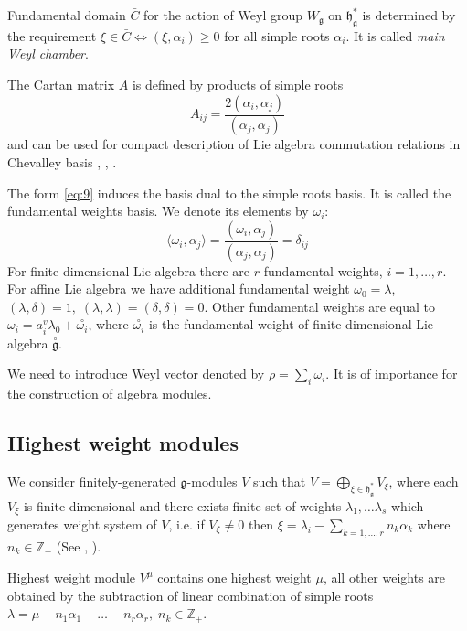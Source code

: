 \documentclass[preprint,12pt]{elsarticle}
\newcommand{\go}{\stackrel{\circ }{\mathfrak{g}}}
\newcommand{\co}[1]{\stackrel{\circ }{#1}}
\newcommand{\gf}{\mathfrak{g}}
\newcommand{\hf}{\mathfrak{h}}
\newcommand{\hfg}{\hf_{\gf}}
\begin{document}
Fundamental domain $\bar{C}$ for the action of Weyl group $W_{\gf}$ on $\hfg^{*}$ is determined by the requirement $\xi\in \bar{C}\Leftrightarrow (\xi,\alpha_{i})\geq 0$ for all simple roots $\alpha_{i}$. It is called {\it main Weyl chamber}.

The Cartan matrix $A$ is defined by products of simple roots
\begin{equation}
  \label{eq:9}
  A_{ij}=\frac{2(\alpha_{i},\alpha_{j})}{(\alpha_{j},\alpha_{j})}
\end{equation}
and can be used for compact description of Lie algebra commutation relations in Chevalley basis \cite{humphreys1997introduction}, \cite{fulton1991representation}, \cite{bourbaki2002lie}.

The form \eqref{eq:9} induces the basis dual  to the simple
roots basis. It is called the fundamental weights basis. We denote
its elements by $\omega_i$:
\begin{equation}
  \label{eq:20}
  \langle\omega_i,\alpha_j\rangle=\frac{(\omega_{i},\alpha_{j})}{(\alpha_{j},\alpha_{j})}=\delta_{ij}
\end{equation}
For finite-dimensional Lie algebra there are $r$ fundamental weights, $i=1,\dots, r$. For affine Lie algebra we have additional fundamental weight $\omega_0=\lambda$, $(\lambda,\delta)=1, \; (\lambda,\lambda)=(\delta,\delta)=0$. Other fundamental weights are equal to $\omega_i=a_i^v \lambda_0 +\co{\omega_i}$, where $\co{\omega_i}$ is the fundamental weight of finite-dimensional Lie algebra $\go$.

We need to introduce Weyl vector denoted by $\rho=\sum_{i} \omega_{i}$. It is of importance for the construction of algebra modules.

\subsection{Highest weight modules}
\label{sec:high-weight-modul}

We consider finitely-generated $\gf$-modules $V$ such that $V=\bigoplus_{\xi\in \hfg^{*}} V_{\xi}$, where each $V_{\xi}$ is finite-dimensional and there exists finite set of weights $\lambda_{1},\dots \lambda_{s}$ which generates weight system of $V$, i.e. if $V_{\xi}\neq 0$ then $\xi=\lambda_{i}-\sum_{k=1,\dots, r} n_{k}\alpha_{k}$ where $n_{k}\in \mathbb{Z}_{+}$ (See \cite{humphreys2008representations}, \cite{carter2005lie}).

Highest weight module $V^{\mu}$ contains one highest weight $\mu$, all other weights are obtained by the subtraction of linear combination of simple roots $\lambda=\mu-n_{1}\alpha_{1}-\dots-n_{r}\alpha_{r},\; n_{k}\in \mathbb{Z}_{+}$.
\end{document}
